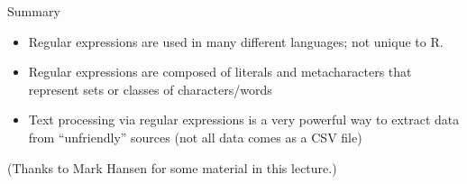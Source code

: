 \documentclass[aspectratio=169]{beamer}
\begin{document}
\begin{frame}{Summary}
\begin{itemize}
\item Regular expressions are used in many different languages; not
  unique to R.
\item Regular expressions are composed of literals and metacharacters
  that represent sets or classes of characters/words
\item Text processing via regular expressions is a very powerful way
  to extract data from ``unfriendly'' sources (not all data comes as a
  CSV file)
\end{itemize}
(Thanks to Mark Hansen for some material in this lecture.)
\end{frame}
\end{document}
